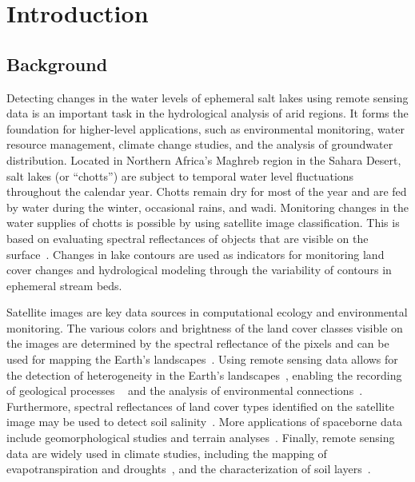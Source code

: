 \documentclass[asi,article,accept,pdftex,moreauthors]{Definitions/mdpi}
\begin{document}
\section{Introduction}

\subsection{Background}
Detecting changes in the water levels of ephemeral salt lakes using remote sensing data is an important task in the hydrological analysis of arid regions{. It forms the foundation} for higher-level applications, such as environmental monitoring, water resource management, climate change studies, {and} the analysis of groundwater distribution{. }Located in Northern Africa's Maghreb region in the Sahara Desert, salt lakes (or ``chotts'') are subject to temporal water level fluctuations throughout the calendar year. Chotts remain dry for  most of the {year and} are fed by water during the winter{, }occasional rains, {and wadi}. Monitoring changes in the water supplies {of chotts} is possible by using satellite image classification{. This} is based on {evaluating }spectral reflectances of objects that are visible on the surface~\cite{Medjani}. Changes in lake contours are used as indicators for monitoring land cover changes and hydrological modeling {through } the variability of contours in ephemeral stream beds.

Satellite images are key data sources in computational ecology and environmental monitoring. The various colors and brightness of the land cover classes visible on the images are determined by {the }spectral reflectance of the pixels and can be used for mapping the Earth{'s landscapes}~\cite{Takorabt,Laghouag,Lemenkova202021,Lemenkova202205,Amri}. Using remote sensing data allows for the detection of heterogeneity in the Earth's landscapes~\cite{Abbas}, enabling the recording of geological processes ~\cite{ARAIBIA2022104455,LAMRI2016143} {} and the analysis of environmental  {connections}~\cite{Deroin2019,data7060074}. {Furthermore}, spectral reflectances of land cover types identified on the satellite image may be used to detect soil salinity~\cite{abdennour2019detection}. {More applications of  spaceborne data include} geomorphological studies and terrain {analyses}~\cite{Rebillard,Lemenkova202127,Lemenkova202105}{. Finally, remote sensing data are widely used in} climate studies, including the mapping of evapotranspiration and droughts~\cite{ijgi11090473}, and the characterization  of soil layers~\cite{MULDER20111}.  
\end{document}
